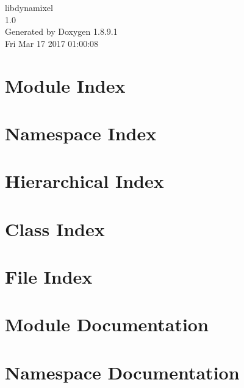 \documentclass[twoside]{book}
\newcommand{\+}{\discretionary{\mbox{\scriptsize$\hookleftarrow$}}{}{}}
\newcommand{\clearemptydoublepage}{%
  \newpage{\pagestyle{empty}\cleardoublepage}%
}
\begin{document}
\hypersetup{pageanchor=false,
             bookmarks=true,
             bookmarksnumbered=true,
             pdfencoding=unicode
            }
\begin{titlepage}
\vspace*{7cm}
\begin{center}%
{\Large libdynamixel \\[1ex]\large 1.\+0 }\\
\vspace*{1cm}
{\large Generated by Doxygen 1.8.9.1}\\
\vspace*{0.5cm}
{\small Fri Mar 17 2017 01:00:08}\\
\end{center}
\end{titlepage}
\clearemptydoublepage
\tableofcontents
\clearemptydoublepage
{}
\hypersetup{pageanchor=true}

\chapter{Module Index}

\chapter{Namespace Index}

\chapter{Hierarchical Index}

\chapter{Class Index}

\chapter{File Index}

\chapter{Module Documentation}


\chapter{Namespace Documentation}







\end{document}
